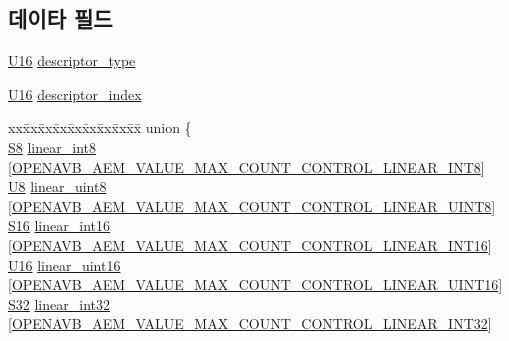 \subsection*{데이타 필드}
\begin{DoxyCompactItemize}
\item 
\hyperlink{openavb__types__base__pub_8h_a0a0a322d5fa4a546d293a77ba8b4a71f}{U16} \hyperlink{structopenavb__aecp__response__data__get__control__t_a1e231d7874aada5925b29affc76782cc}{descriptor\+\_\+type}
\item 
\hyperlink{openavb__types__base__pub_8h_a0a0a322d5fa4a546d293a77ba8b4a71f}{U16} \hyperlink{structopenavb__aecp__response__data__get__control__t_ab26fb363c24b9a2a4391f9171c981b08}{descriptor\+\_\+index}
\item 
\begin{tabbing}
xx\=xx\=xx\=xx\=xx\=xx\=xx\=xx\=xx\=\kill
union \{\\
\>\hyperlink{openavb__types__base__pub_8h_af1475a0bb1962ef08dd1f78bd5dba87a}{S8} \hyperlink{structopenavb__aecp__response__data__get__control__t_a45419fbe4bd6ac07e20b168e97eef09c}{linear\_int8} \mbox{[}\hyperlink{openavb__aem__types__pub_8h_ad575315ad30a52b9095a9c75a9abc2bb}{OPENAVB\_AEM\_VALUE\_MAX\_COUNT\_CONTROL\_LINEAR\_INT8}\mbox{]}\\
\>\hyperlink{openavb__types__base__pub_8h_aa63ef7b996d5487ce35a5a66601f3e73}{U8} \hyperlink{structopenavb__aecp__response__data__get__control__t_abba20e198ce6ebb10558f9a36efff81d}{linear\_uint8} \mbox{[}\hyperlink{openavb__aem__types__pub_8h_a10723b8b51aeafeae5cbe0190b623562}{OPENAVB\_AEM\_VALUE\_MAX\_COUNT\_CONTROL\_LINEAR\_UINT8}\mbox{]}\\
\>\hyperlink{openavb__types__base__pub_8h_a6d241ad21a823c90d4835380787db5d4}{S16} \hyperlink{structopenavb__aecp__response__data__get__control__t_a971e2e30fcd86963178d3445519eccf4}{linear\_int16} \mbox{[}\hyperlink{openavb__aem__types__pub_8h_ae368778860931dd6fbe81c0ad8c8286d}{OPENAVB\_AEM\_VALUE\_MAX\_COUNT\_CONTROL\_LINEAR\_INT16}\mbox{]}\\
\>\hyperlink{openavb__types__base__pub_8h_a0a0a322d5fa4a546d293a77ba8b4a71f}{U16} \hyperlink{structopenavb__aecp__response__data__get__control__t_afd0deb9ad36fea24f7188886e6899474}{linear\_uint16} \mbox{[}\hyperlink{openavb__aem__types__pub_8h_a9f425d29d7532d609c77c5efcb2bbd14}{OPENAVB\_AEM\_VALUE\_MAX\_COUNT\_CONTROL\_LINEAR\_UINT16}\mbox{]}\\
\>\hyperlink{openavb__types__base__pub_8h_a39c786017723555afb9e8b85accec0de}{S32} \hyperlink{structopenavb__aecp__response__data__get__control__t_a0f999ad24beb8f01ba18c3059fa0769f}{linear\_int32} \mbox{[}\hyperlink{openavb__aem__types__pub_8h_a985968a860b9e18c493e864357ee476a}{OPENAVB\_AEM\_VALUE\_MAX\_COUNT\_CONTROL\_LINEAR\_INT32}\mbox{]}\\

\end{tabbing}
\end{DoxyCompactItemize}
